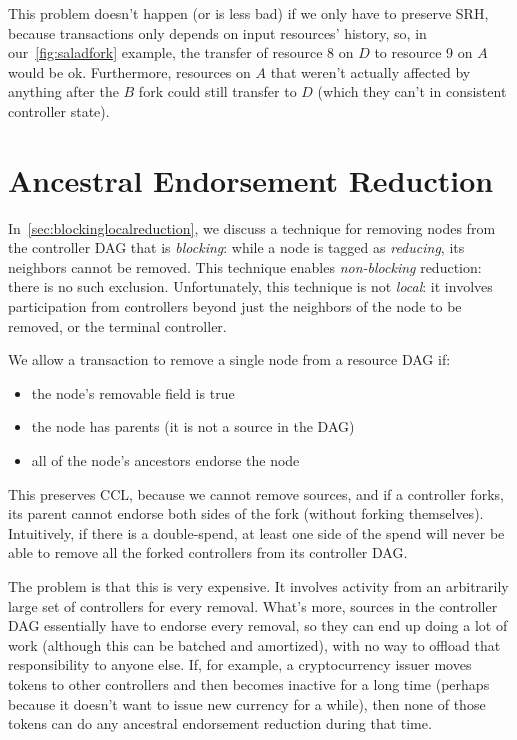 \documentclass[a4paper,USenglish,cleveref, autoref, thm-restate, anonymous]{lipics-v2021}
\begin{document}
This problem doesn't happen (or is less bad) if we only have to preserve SRH, because transactions only depends on input resources' history, so, in our~\cref{fig:saladfork} example, the transfer of resource 8 on $D$ to resource 9 on $A$ would be ok.
Furthermore, resources on $A$ that weren't actually affected by anything after the $B$ fork could still transfer to $D$ (which they can't in consistent controller state). 


\section{Ancestral Endorsement Reduction}
\label{sec:ancestral}
In~\cref{sec:blockinglocalreduction}, we discuss a technique for removing nodes from the controller DAG that is \emph{blocking}: while a node is tagged as \emph{reducing}, its neighbors cannot be removed.
This technique enables \emph{non-blocking} reduction: there is no such exclusion.
Unfortunately, this technique is not \emph{local}: it involves participation from controllers beyond just the neighbors of the node to be removed, or the terminal controller.

We allow a transaction to remove a single node from a resource DAG if:
\begin{itemize}
    \item the node's removable field is true
    \item the node has parents (it is not a source in the DAG)
    \item all of the node's ancestors endorse the node
\end{itemize}
This preserves CCL, because we cannot remove sources, and if a controller forks, its parent cannot endorse both sides of the fork (without forking themselves). 
Intuitively, if there is a double-spend, at least one side of the spend will never be able to remove all the forked controllers from its controller DAG. 

The problem is that this is very expensive. 
It involves activity from an arbitrarily large set of controllers for every removal. 
What's more, sources in the controller DAG essentially have to endorse every removal, so they can end up doing a lot of work (although this can be batched and amortized), with no way to offload that responsibility to anyone else. 
If, for example, a cryptocurrency issuer moves tokens to other controllers and then becomes inactive for a long time (perhaps because it doesn't want to issue new currency for a while), then none of those tokens can do any ancestral endorsement reduction during that time.
\end{document}
